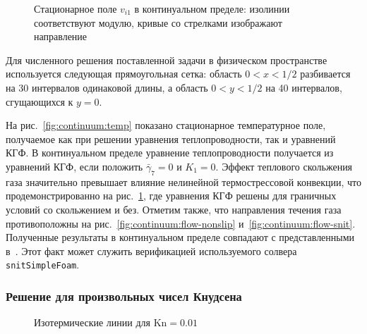 \documentclass[
aps,%
12pt,%
final,%
notitlepage,%
oneside,%
onecolumn,%
nobibnotes,%
nofootinbib,%
superscriptaddress,%
noshowpacs,%
showkeys,%
centertags]%
{revtex4}
\newcommand{\Kn}{\mathrm{Kn}}
\begin{document}
\begin{figure}
    \centering
    \caption{Стационарное поле \(v_{i1}\) в континуальном пределе:
        изолинии соответствуют модулю, кривые со стрелками изображают направление}
    \label{fig:continuum:flow}
\end{figure}

Для численного решения поставленной задачи в физическом пространстве
используется следующая прямоугольная сетка:
область \(0<x<1/2\) разбивается на 30 интервалов одинаковой длины,
а область \(0<y<1/2\) на 40 интервалов, сгущающихся к \(y=0\).

На рис.~\ref{fig:continuum:temp} показано стационарное температурное поле,
получаемое как при решении уравнения теплопроводности, так и уравнений КГФ.
В континуальном пределе уравнение теплопроводности получается из уравнений КГФ,
если положить \(\bar{\gamma}_7=0\) и \(K_1=0\).
Эффект теплового скольжения газа значительно превышает влияние нелинейной термострессовой конвекции,
что продемонстрированно на рис.~\ref{fig:continuum:flow}, где уравнения КГФ решены
для граничных условий со скольжением и без.
Отметим также, что направления течения газа противоположны на рис.~\ref{fig:continuum:flow-nonslip}
и~\ref{fig:continuum:flow-snit}.
Полученные результаты в континуальном пределе совпадают с представленными в~\cite{Sone1996}.
Этот факт может служить верификацией используемого солвера \verb+snitSimpleFoam+.

\subsubsection{Решение для произвольных чисел Кнудсена}

\begin{figure}
    \centering
    \caption{Изотермические линии для \(\Kn=0.01\)}
    \label{fig:kn0.01:temp}
\end{figure}
\end{document}
